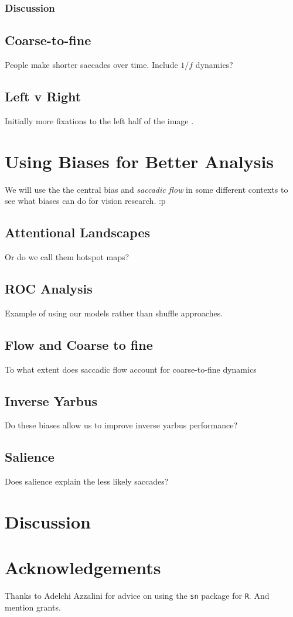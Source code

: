 \documentclass[a4paper, onecolumn, oneside, 11pt]{article}
\begin{document}
\subsubsection{Discussion}



\subsection{Coarse-to-fine}

People make shorter saccades over time. Include $1/f$ dynamics? 

\subsection{Left v Right}

Initially more fixations to the left half of the image \citep{nuthmann-matthias2014}.

\section{Using Biases for Better Analysis}

We will use the the central bias \citep{clarke-tatler2014} and \textit{saccadic flow} in some different contexts to see what biases can do for vision research. :p


\subsection{Attentional Landscapes}

Or do we call them hotspot maps?

\subsection{ROC Analysis}

Example of using our models rather than shuffle approaches.

\subsection{Flow and Coarse to fine}
To what extent does saccadic flow account for coarse-to-fine dynamics

\subsection{Inverse Yarbus}

Do these biases allow us to improve inverse yarbus performance?

\subsection{Salience}

Does salience explain the less likely saccades? 

\section{Discussion}

\section*{Acknowledgements}

Thanks to Adelchi Azzalini for advice on using the \texttt{sn} package for \texttt{R}. And mention grants. 


\small

\end{document}
